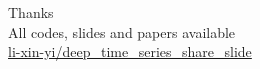 \documentclass{ctexbeamer}
\begin{document}
\begin{frame}{}
  \begin{center}
  {\Huge{Thanks}} \\
  All codes, slides and papers available\\
  \faGithub \href{https://github.com/li-xin-yi/deep_time_series_share_slide}{li-xin-yi/deep\_time\_series\_share\_slide}
\end{center}
\end{frame}
\end{document}
